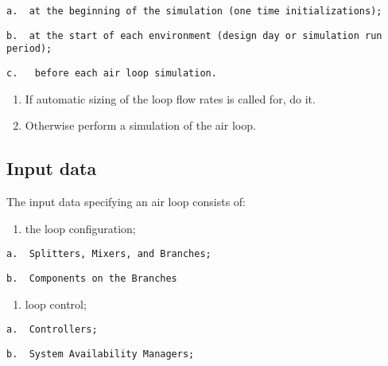 \begin{lstlisting}
a.  at the beginning of the simulation (one time initializations);
\end{lstlisting}

\begin{lstlisting}
b.  at the start of each environment (design day or simulation run period);
\end{lstlisting}

\begin{lstlisting}
c.   before each air loop simulation.
\end{lstlisting}

\begin{enumerate}
\def\labelenumi{\arabic{enumi}.}
\setcounter{enumi}{2}
\item
  If automatic sizing of the loop flow rates is called for, do it.
\item
  Otherwise perform a simulation of the air loop.
\end{enumerate}

\subsection{Input data}\label{input-data}

The input data specifying an air loop consists of:

\begin{enumerate}
\def\labelenumi{\arabic{enumi}.}
\tightlist
\item
  the loop configuration;
\end{enumerate}

\begin{lstlisting}
a.  Splitters, Mixers, and Branches;
\end{lstlisting}

\begin{lstlisting}
b.  Components on the Branches
\end{lstlisting}

\begin{enumerate}
\def\labelenumi{\arabic{enumi}.}
\setcounter{enumi}{1}
\tightlist
\item
  loop control;
\end{enumerate}

\begin{lstlisting}
a.  Controllers;
\end{lstlisting}

\begin{lstlisting}
b.  System Availability Managers;
\end{lstlisting}

